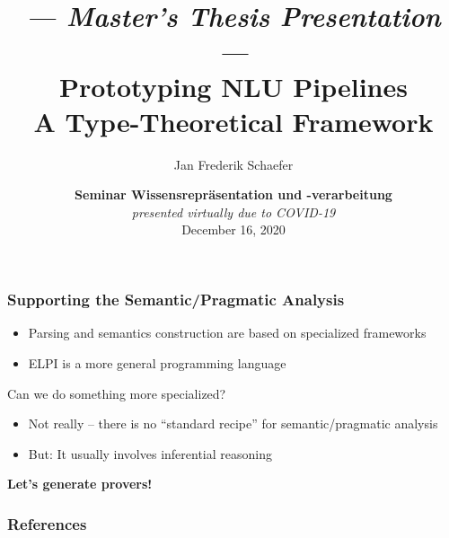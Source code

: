 \documentclass[aspectratio=169]{beamer}
\title{{\footnotesize\itshape --- Master's Thesis Presentation ---}\\[1pt] Prototyping NLU Pipelines\\[3pt] \normalsize A Type-Theoretical Framework}
\author{Jan Frederik Schaefer}
\institute{FAU Erlangen-N\"urnberg}
\date{\textbf{Seminar Wissensrepr\"asentation und -verarbeitung} \\ \textit{presented virtually due to COVID-19} \\ December 16, 2020 }
\begin{document}
\frame\titlepage






{
    
}





\begin{frame}
    \frametitle{Supporting the Semantic/Pragmatic Analysis}
    \begin{itemize}
        \item Parsing and semantics construction are based on specialized frameworks
        \item ELPI is a more general programming language
    \end{itemize}
    
    \vspace{1em}
    Can we do something more specialized?
    \begin{itemize}
        \item Not really -- there is no ``standard recipe'' for
            semantic/pragmatic analysis
        \item But: It usually involves inferential reasoning
    \end{itemize}

    \vspace{2em}
    \centering
    \bfseries Let's generate provers!\par
\end{frame}



% 
%     

\appendix

\begin{frame}[allowframebreaks,t]
    \frametitle{References}
    \printbibliography
\end{frame}
\end{document}
